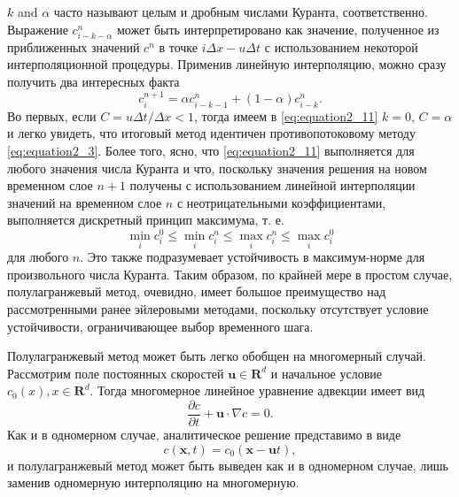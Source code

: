 $k$ and $\alpha$ часто называют целым и дробным числами Куранта, соответственно. Выражение $c_{i-k-\alpha}^n$ может быть интерпретировано как значение, полученное из приближенных значений $c^n$ в точке $i\Delta x - u\Delta t$ с использованием некоторой интерполяционной процедуры. Применив линейную интерполяцию, можно сразу получить два интересных факта
%
\begin{equation}
\label{eq:equation2_11}
c_i^{n+1} = \alpha c_{i-k-1}^{n} + (1-\alpha)c_{i-k}^n.
\end{equation}
%
Во первых, если $C = u\Delta t/\Delta x < 1$, тогда имеем в \eqref{eq:equation2_11} $k=0$, $C=\alpha$ и  легко увидеть, что итоговый метод идентичен противопотоковому методу \eqref{eq:equation2_3}. Более того, ясно, что \eqref{eq:equation2_11} выполняется для любого значения числа Куранта и что, поскольку значения решения на новом временном слое $n+1$ получены с использованием линейной интерполяции значений на временном слое $n$ с неотрицательными коэффициентами, выполняется дискретный принцип максимума, т. е.
%
\begin{equation}
\label{eq:equation2_12}
\min_i c_i^0 \le \min_i c_i^n \le \max_i c_i^n \le \max_i c_i^0
\end{equation}
%
для любого $n$. Это также подразумевает устойчивость в максимум-норме для произвольного числа Куранта. Таким образом, по крайней мере в простом случае, полулагранжевый метод, очевидно, имеет большое преимущество над рассмотренными ранее эйлеровыми методами, поскольку отсутствует условие устойчивости, ограничивающее выбор временного шага.

Полулагранжевый метод может быть легко обобщен на многомерный случай. Рассмотрим поле постоянных скоростей $\mathbf{u}\in\mathbf{R}^d$ и начальное условие $c_0(x), x\in\mathbf{R}^d$. Тогда многомерное линейное уравнение адвекции имеет вид
%
\begin{equation}
\label{eq:equation2_13}
\frac{\partial{c}}{\partial{t}} + \mathbf{u} \cdot \nabla c = 0.
\end{equation}
%
Как и в одномерном случае, аналитическое решение представимо в виде
%
\begin{equation}
\label{eq:equation2_14}
c(\mathbf{x}, t) = c_0(\mathbf{x} - \mathbf{u}t),
\end{equation}
%
и полулагранжевый метод может быть выведен как и в одномерном случае, лишь заменив одномерную интерполяцию на многомерную.
	
